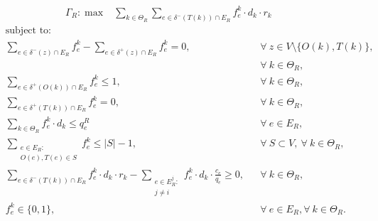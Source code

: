 \documentclass{article}
\begin{document}
\begin{appendices}
  \begin{align}
        &  \Gamma_R: \max  & \sum_{k \in \Theta_R} \sum_{e \in \delta^-(T(k))\cap E_R}  f_e^k \cdot d_k \cdot r_k &&   
    \end{align}
    \begin{align}
        & \text{subject to:}       && \nonumber\\
        & \sum_{e \in \delta^-(z)\cap E_R} f_e^k-\sum_{e \in \delta^+(z)\cap E_R} f_{e}^k  = 0,           \quad && \forall\ z\in V\setminus\{O(k),T(k)\},\nonumber\\
        & && \forall\ k\in\Theta_R, \\[1em]
& \sum_{e \in \delta^+(O(k))\cap E_R} f_e^k\leq 1, && \forall\ k\in \Theta_R,  \\
& \sum_{e \in \delta^+(T(k))\cap E_R} f_e^k  = 0, && \forall\ k\in \Theta_R,  \\
 & \sum_{k \in \Theta_R} f_e^k\cdot d_k \leq q_e^R   &&\forall\ e \in E_R,   \\
& \sum_{\substack{e\in E_R\colon\\O(e),T(e)\in S }} f_e^k \leq |S| -1,  && \forall\ S \subset V, \ \forall\ k \in \Theta_R, \\
& \sum_{e \in \delta^-(T(k))\cap E_R}  f_e^k  \cdot d_k \cdot r_k -\sum_{\substack{e \in E_R^j\colon \\ j\not = i}} f_e^k \cdot d_k \cdot \frac{c_e}{q_e}\geq 0, && \forall\ k \in \Theta_R, \\
& f_e^k \in \{0,1\},    && \forall\ e \in E_R, \forall\ k \in \Theta_R.
    \end{align}

\end{appendices}
\end{document}
